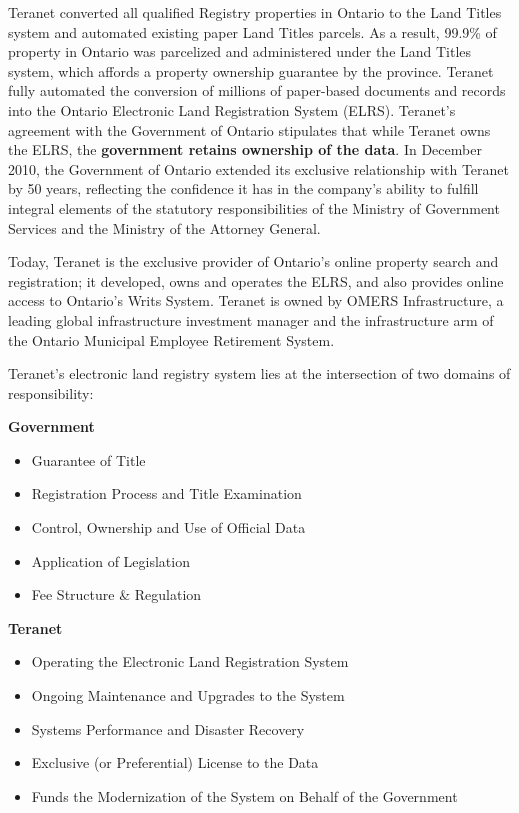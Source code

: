 Teranet converted all qualified Registry properties in Ontario to the Land Titles system and automated existing paper Land Titles parcels.
As a result, 99.9\% of property in Ontario was parcelized and administered under the Land Titles system, which affords a property ownership guarantee by the province.
Teranet fully automated the conversion of millions of paper-based documents and records into the Ontario Electronic Land Registration System (ELRS).
Teranet's agreement with the Government of Ontario stipulates that while Teranet owns the ELRS, the \textbf{government retains ownership of the data}.
In December 2010, the Government of Ontario extended its exclusive relationship with Teranet by 50 years, reflecting the confidence it has in the company's ability to fulfill integral elements of the statutory responsibilities of the Ministry of Government Services and the Ministry of the Attorney General.

Today, Teranet is the exclusive provider of Ontario's online property search and registration;
it developed, owns and operates the ELRS, and also provides online access to Ontario's Writs System.
Teranet is owned by OMERS Infrastructure, a leading global infrastructure investment manager and the infrastructure arm of the Ontario Municipal Employee Retirement System.

\vspace{5mm}

Teranet's electronic land registry system lies at the intersection of two domains of responsibility:

\vspace{5mm}

\textbf{Government}

\begin{itemize}
    \item Guarantee of Title
    \item Registration Process and Title Examination
    \item Control, Ownership and Use of Official Data
    \item Application of Legislation
    \item Fee Structure \& Regulation
\end{itemize}

\vspace{5mm}

\newpage

\textbf{Teranet}

\begin{itemize}
    \item Operating the Electronic Land Registration System
    \item Ongoing Maintenance and Upgrades to the System
    \item Systems Performance and Disaster Recovery
    \item Exclusive (or Preferential) License to the Data
    \item Funds the Modernization of the System on Behalf of the Government
\end{itemize}

